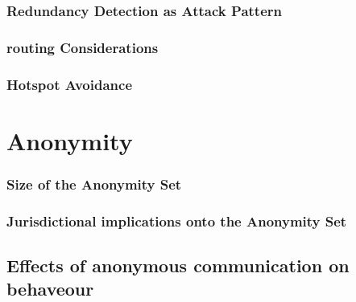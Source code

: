 
\subsection{Redundancy Detection as Attack Pattern}


\subsection{routing Considerations}


\subsection{Hotspot Avoidance}



\chapter{Anonymity}

\subsection{Size of the Anonymity Set}


\subsection{Jurisdictional implications onto the Anonymity Set}


\section{Effects of anonymous communication on behaveour}


